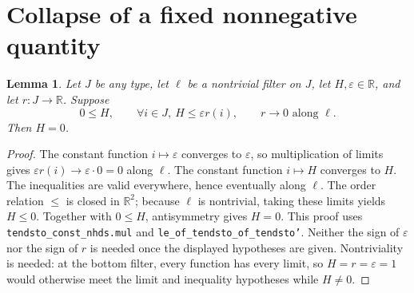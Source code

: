 \documentclass[11pt]{article}
\newtheorem{lemma}[theorem]{Lemma}
\theoremstyle{definition}
\theoremstyle{remark}
\newcommand{\R}{\mathbb R}
\numberwithin{equation}{section}
\begin{document}
\section{Collapse of a fixed nonnegative quantity}
\begin{lemma}\label{closure:filter-limit}
Let $J$ be any type, let $\ell$ be a nontrivial filter on $J$, let
$H,\varepsilon\in\R$, and let $r:J\to\R$.  Suppose
\[
 0\leq H,\qquad \forall i\in J,\ H\leq\varepsilon r(i),
 \qquad r\longrightarrow0\text{ along }\ell.
\]
Then $H=0$.
\end{lemma}
\begin{proof}
The constant function $i\mapsto\varepsilon$ converges to
$\varepsilon$, so multiplication of limits gives
$\varepsilon r(i)\to\varepsilon\cdot0=0$ along $\ell$.
The constant function $i\mapsto H$ converges to $H$.
The inequalities are valid everywhere, hence eventually along $\ell$.
The order relation $\leq$ is closed in $\R^2$; because $\ell$ is
nontrivial, taking these limits yields $H\leq0$.  Together with
$0\leq H$, antisymmetry gives $H=0$.
This proof uses \texttt{tendsto\_const\_nhds.mul} and
\texttt{le\_of\_tendsto\_of\_tendsto'}.
Neither the sign of $\varepsilon$ nor the sign of $r$ is needed once
the displayed hypotheses are given.  Nontriviality is needed: at the
bottom filter, every function has every limit, so $H=r=\varepsilon=1$
would otherwise meet the limit and inequality hypotheses while
$H\ne0$.
\end{proof}
\end{document}
